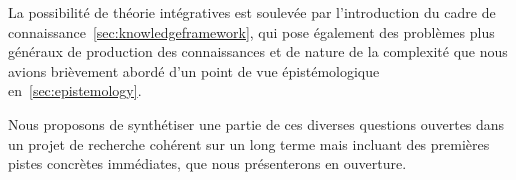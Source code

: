 La possibilité de théorie intégratives est soulevée par l'introduction du cadre de connaissance~\ref{sec:knowledgeframework}, qui pose également des problèmes plus généraux de production des connaissances et de nature de la complexité que nous avions brièvement abordé d'un point de vue épistémologique en~\ref{sec:epistemology}.


Nous proposons de synthétiser une partie de ces diverses questions ouvertes dans un projet de recherche cohérent sur un long terme mais incluant des premières pistes concrètes immédiates, que nous présenterons en ouverture.




\stars
